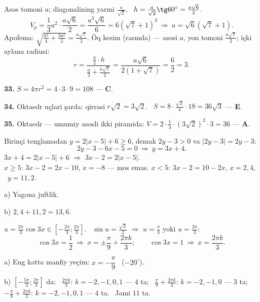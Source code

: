 \newpage
{}
Asos tomoni $a$; diagonalining yarmi $\frac a{\sqrt2}$, \ $h=\frac a{\sqrt2}\tg60^\circ=\frac{a\sqrt6}2$.
\[V_p=\frac13a^2\cdot\frac{a\sqrt6}2=\frac{a^3\sqrt6}6=6\left(\sqrt7+1\right)^3\ \Rightarrow\ a=\sqrt6\left(\sqrt7+1\right).\]
Apofema: $\sqrt{\frac{a^2}4+\frac{3a^2}2}=\frac{a\sqrt7}2$. Öq kesim (rasmda) — asosi $a$, yon tomoni $\frac{a\sqrt7}2$; içki aylana radiusi:
\[r=\frac{\frac a2\cdot h}{\frac a2+\frac{a\sqrt7}2}=\frac{a\sqrt6}{2\left(1+\sqrt7\right)}=\frac{6}{2}=3.\]

\textbf{33.} $S=4\pi r^2=4\cdot3\cdot9=108$ — \textbf{C}.

\textbf{34.} Oktaedr uçlari şarda: qirrasi $r\sqrt2=3\sqrt2$. \ $S=8\cdot\frac{\sqrt3}4\cdot18=36\sqrt3$ — \textbf{E}.

\textbf{35.} Oktaedr — umumiy asosli ikki piramida: $V=2\cdot\frac13\cdot\left(3\sqrt2\right)^2\cdot3=36$ — \textbf{A}.

\newpage
{}
Birinçi tenglamadan $y=2|x-5|+6\ge6$, demak $2y-3>0$ va $|2y-3|=2y-3$:
\[2y-3-6x-5=0\ \Rightarrow\ y=3x+4.\]
$3x+4=2|x-5|+6$ $\Rightarrow$ $3x-2=2|x-5|$.\\
$x\ge5$: $3x-2=2x-10$, $x=-8$ — mos emas. \quad $x<5$: $3x-2=10-2x$, $x=2{,}4$, \ $y=11{,}2$.

a) Yagona juftlik.

b) $2{,}4+11{,}2=13{,}6$.

\newpage
{}
$u=\frac{2\pi}3\cos3x\in\left[-\frac{2\pi}3;\frac{2\pi}3\right]$. \ $\sin u=\frac{\sqrt3}2$ $\Rightarrow$ $u=\frac\pi3$ yoki $u=\frac{2\pi}3$:
\[\cos3x=\frac12\ \Rightarrow\ x=\pm\frac\pi9+\frac{2\pi k}3;\qquad \cos3x=1\ \Rightarrow\ x=\frac{2\pi k}3.\]

a) Eng katta manfiy yeçim: $x=-\dfrac\pi9$ \ ($-20^\circ$).

b) $\left[-\frac{5\pi}3;\frac{2\pi}3\right]$ da: \ $\frac{2\pi k}3$: $k=-2,-1,0,1$ — $4$ ta; \ $\frac\pi9+\frac{2\pi k}3$: $k=-2,-1,0$ — $3$ ta;\\
$-\frac\pi9+\frac{2\pi k}3$: $k=-2,-1,0,1$ — $4$ ta. \ Jami $11$ ta.

